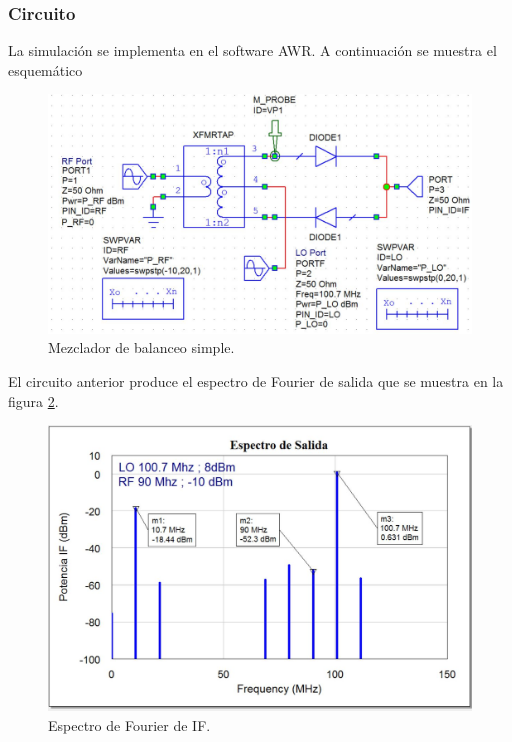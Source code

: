 \documentclass[twocolumn]{article}
\begin{document}
\subsubsection{Circuito}
La simulación se implementa en el software AWR. A continuación se muestra el esquemático
\begin{figure}[H]
  \centering    
	\includegraphics[width=\columnwidth]{imagenes/circuito2.jpg}
	\caption{Mezclador de balanceo simple.}\label{fig:circuito2}
\end{figure}

El circuito anterior produce el espectro de Fourier de salida que se muestra en la figura \textcolor{blue}{\ref{fig:IF2}}.
\begin{figure}[H]
  \centering    
	\includegraphics[scale=0.35]{imagenes/IF2.jpg}
	\caption{Espectro de Fourier de IF.}\label{fig:IF2}
\end{figure}
%
\end{document}
